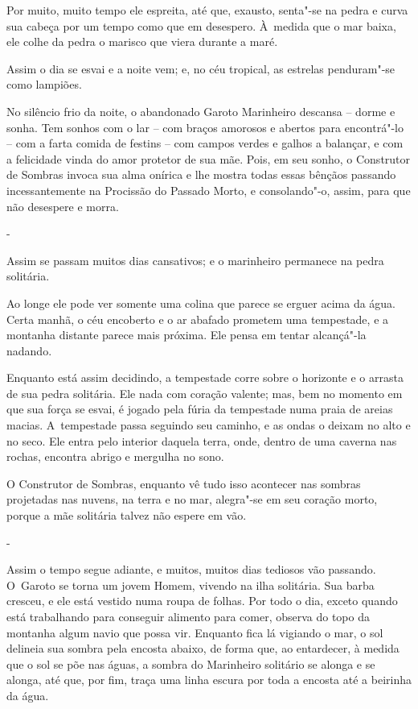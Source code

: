 Por muito, muito tempo ele espreita, até que, exausto, senta"-se na pedra
e curva sua cabeça por um tempo como que em desespero. À~medida que o
mar baixa, ele colhe da pedra o marisco que viera durante a maré.

Assim o dia se esvai e a noite vem; e, no céu tropical, as estrelas
penduram"-se como lampiões.

No silêncio frio da noite, o abandonado Garoto Marinheiro descansa --
dorme e sonha. Tem sonhos com o lar -- com braços amorosos e abertos
para encontrá"-lo -- com a farta comida de festins -- com campos verdes e
galhos a balançar, e com a felicidade vinda do amor protetor de sua mãe.
Pois, em seu sonho, o Construtor de Sombras invoca sua alma onírica e
lhe mostra todas essas bênçãos passando incessantemente na Procissão do
Passado Morto, e consolando"-o, assim, para que não desespere e morra.

-

Assim se passam muitos dias cansativos; e o marinheiro permanece na
pedra solitária.

Ao longe ele pode ver somente uma colina que parece se erguer acima da
água. Certa manhã, o céu encoberto e o ar abafado prometem uma
tempestade, e a montanha distante parece mais próxima. Ele pensa em
tentar alcançá"-la nadando.

Enquanto está assim decidindo, a tempestade corre sobre o horizonte e o
arrasta de sua pedra solitária. Ele nada com coração valente; mas, bem
no momento em que sua força se esvai, é jogado pela fúria da tempestade
numa praia de areias macias. A~tempestade passa seguindo seu caminho, e
as ondas o deixam no alto e no seco. Ele entra pelo interior daquela
terra, onde, dentro de uma caverna nas rochas, encontra abrigo e
mergulha no sono.

O Construtor de Sombras, enquanto vê tudo isso acontecer nas sombras
projetadas nas nuvens, na terra e no mar, alegra"-se em seu coração
morto, porque a mãe solitária talvez não espere em vão.

-

Assim o tempo segue adiante, e muitos, muitos dias tediosos vão
passando. O~Garoto se torna um jovem Homem, vivendo na ilha solitária.
Sua barba cresceu, e ele está vestido numa roupa de folhas. Por todo o
dia, exceto quando está trabalhando para conseguir alimento para comer,
observa do topo da montanha algum navio que possa vir. Enquanto fica lá
vigiando o mar, o sol delineia sua sombra pela encosta abaixo, de forma
que, ao entardecer, à medida que o sol se põe nas águas, a sombra do
Marinheiro solitário se alonga e se alonga, até que, por fim, traça uma
linha escura por toda a encosta até a beirinha da água.

